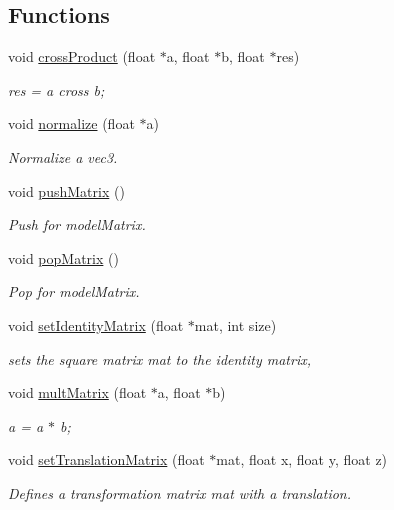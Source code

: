 \subsection*{Functions}
\begin{DoxyCompactItemize}
\item 
void \hyperlink{model_8cu_a96f0bcc043e99751492999cad2331294}{cross\-Product} (float $\ast$a, float $\ast$b, float $\ast$res)
\begin{DoxyCompactList}\small\item\em res = a cross b; \end{DoxyCompactList}\item 
void \hyperlink{model_8cu_af265c7fe42c6561c1e009e1828e5df34}{normalize} (float $\ast$a)
\begin{DoxyCompactList}\small\item\em Normalize a vec3. \end{DoxyCompactList}\item 
void \hyperlink{model_8cu_ae7c71faeeb4cab42687f7ed10c25e500}{push\-Matrix} ()
\begin{DoxyCompactList}\small\item\em Push for model\-Matrix. \end{DoxyCompactList}\item 
void \hyperlink{model_8cu_a89162c73545bb184c781c825dd72f082}{pop\-Matrix} ()
\begin{DoxyCompactList}\small\item\em Pop for model\-Matrix. \end{DoxyCompactList}\item 
void \hyperlink{model_8cu_ab3e5ee415241ca2d35bcdb84b39dfa90}{set\-Identity\-Matrix} (float $\ast$mat, int size)
\begin{DoxyCompactList}\small\item\em sets the square matrix mat to the identity matrix, \end{DoxyCompactList}\item 
void \hyperlink{model_8cu_a57427e9a54f840bbc82d719aa9762ab4}{mult\-Matrix} (float $\ast$a, float $\ast$b)
\begin{DoxyCompactList}\small\item\em a = a $\ast$ b; \end{DoxyCompactList}\item 
void \hyperlink{model_8cu_a78d7c04718261e6caa38ff87be705787}{set\-Translation\-Matrix} (float $\ast$mat, float x, float y, float z)
\begin{DoxyCompactList}\small\item\em Defines a transformation matrix mat with a translation. \end{DoxyCompactList}\item 

\end{DoxyCompactItemize}
